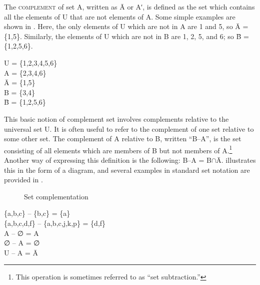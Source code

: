 The \textsc{complement} of set A, written as \=A or Aʹ, is defined as the set which contains all the elements of U that are not elements of A. Some simple examples are shown in . Here, the only elements of U which are not in A are 1 and 5, so \=A = \{1,5\}. Similarly, the elements of U which are not in B are 1, 2, 5, and 6; so \=B = \{1,2,5,6\}.


\ea \label{ex:13.17}
U = \{1,2,3,4,5,6\}\\
A = \{2,3,4,6\}\\
\=A = \{1,5\}\\
B = \{3,4\}\\
\=B = \{1,2,5,6\}
\z


This basic notion of complement set involves complements relative to the universal set U. It is often useful to refer to the complement of one set relative to some other set. The complement of A relative to B, written “B–A”, is the set consisting of all elements which are members of B but not members of A.\footnote{This operation is sometimes referred to as “set subtraction.”} Another way of expressing this definition is the following: B–A = B${\cap}$\=A.  illustrates this in the form of a diagram, and several examples in standard set notation are provided in .

\begin{figure}
\caption{\label{fig:key:4} Set complementation}
\end{figure}

\begin{stylepoints} \label{ex:13.18}
\{a,b,c\} – \{b,c\} = \{a\}\\
\{a,b,c,d,f\} – \{a,b,c,j,k,p\} = \{d,f\}\\
A – ∅ = A\\
∅ – A = ∅\\
U – A = \=A
\end{stylepoints}


